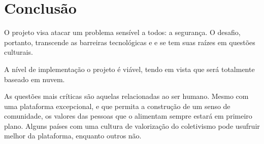 \chapter{Conclusão}
\label{c.conclusao}


O projeto visa atacar um problema sensível a todos: a segurança. O desafio, portanto, transcende as barreiras tecnológicas e e se tem suas raízes em questões culturais.

A nível de implementação o projeto é viável, tendo em vista que será totalmente baseado em nuvem.

As questões mais críticas são aquelas relacionadas ao ser humano. Mesmo com uma plataforma excepcional, e que permita a construção de um senso de comunidade, os valores das pessoas que o alimentam sempre estará em primeiro plano. Alguns países  com uma cultura de valorização do coletivismo pode usufruir melhor da plataforma, enquanto outros não.

